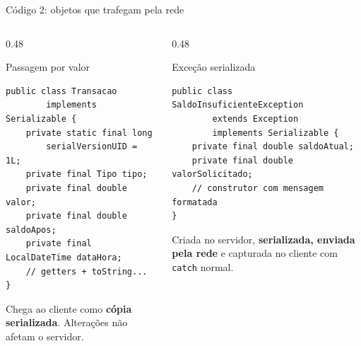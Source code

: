 \documentclass[aspectratio=169]{beamer}
\newcommand{\code}[1]{\texttt{#1}}
\begin{document}
\begin{frame}[fragile]{Código 2: objetos que trafegam pela rede}
    \begin{columns}[T]
        \begin{column}{0.48\textwidth}
            \begin{block}{Passagem por valor}
\begin{lstlisting}[basicstyle=\ttfamily\tiny]
public class Transacao
        implements Serializable {
    private static final long
        serialVersionUID = 1L;
    private final Tipo tipo;
    private final double valor;
    private final double saldoApos;
    private final LocalDateTime dataHora;
    // getters + toString...
}
\end{lstlisting}
            \end{block}
            \small Chega ao cliente como \textbf{cópia serializada}. Alterações não afetam o servidor.
        \end{column}

        \begin{column}{0.48\textwidth}
            \begin{block}{Exceção serializada}
\begin{lstlisting}[basicstyle=\ttfamily\tiny]
public class SaldoInsuficienteException
        extends Exception
        implements Serializable {
    private final double saldoAtual;
    private final double valorSolicitado;
    // construtor com mensagem formatada
}
\end{lstlisting}
            \end{block}
            \small Criada no servidor, \textbf{serializada, enviada pela rede} e capturada no cliente com \code{catch} normal.
        \end{column}
    \end{columns}
\end{frame}
\end{document}

